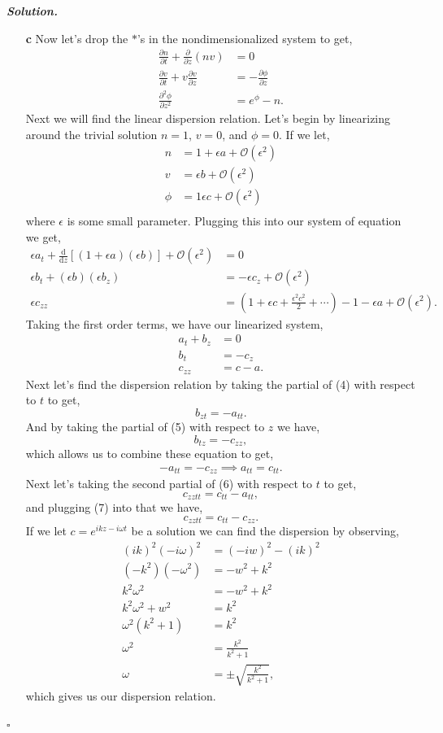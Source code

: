 \documentclass[12pt]{report}
\newenvironment{solution}[1][\it{Solution}]{\textbf{#1. } }{$\square$}
\def\eps{{\epsilon}}
\def\O{{\mathcal{O}}}
\newcommand{\pp}[2]{\frac{\partial #1}{\partial #2}} %
\newcommand{\ppn}[3]{\frac{\partial^{#1} #2}{\partial #3^{#1}}} %
\newcommand{\dd}[2]{\frac{\mathrm{d} #1}{\mathrm{d} #2}} %
\begin{document}
\begin{solution}
\begin{enumerate}
    \item[{\bf c}] Now let's drop the $*$'s in the nondimensionalized system to get, 
    \begin{align*}
        \pp{n}{t}+\pp{}{z}(nv)&=0\\
        \pp{v}{t}+v\pp{v}{z}&= -\pp{\phi}{z}\\
        \ppn{2}{\phi}{z}&= e^\phi-n.    
    \end{align*}
    Next we will find the linear dispersion relation. Let's begin by linearizing around the trivial solution $n=1$, $v=0$, and
    $\phi=0$. If we let,
    \begin{align*}
        n &= 1 + \eps a + \O(\eps^2)\\
        v &= \eps b + \O(\eps^2)\\
        \phi &= 1 \eps c + \O(\eps^2)\\
    \end{align*}
    where $\eps$ is some small parameter. Plugging this into our system of equation we get,
    \begin{align*}
        \eps a_t + \dd{}{z}\left[ (1+\eps a)(\eps b)\right] + \O(\eps^2)&=0\\
        \eps b_t + (\eps b)(\eps b_z) &= -\eps c_z + \O(\eps^2)\\
        \eps c_{zz} &= \left( 1 + \eps c + \frac{\eps^2 c^2}{2} + \cdots \right) - 1 - \eps a + \O(\eps^2).
    \end{align*}
    Taking the first order terms, we have our linearized system,
    \begin{align}
        a_t + b_z &= 0\\
        b_t &= - c_z\\
        c_{zz} &= c - a.
    \end{align}
    Next let's find the dispersion relation by taking the partial of (4) with respect to $t$ to get,
    \[b_{zt} = -a_{tt}.\]
    And by taking the partial of (5) with respect to $z$ we have,
    \[b_{tz} = -c_{zz},\]
    which allows us to combine these equation to get,
    \begin{align}
        -a_{tt} = -c_{zz} \implies a_{tt} = c_{tt}.
    \end{align}
    Next let's taking the second partial of (6) with respect to $t$ to get,
    \[ c_{zztt} = c_{tt} - a_{tt},\]
    and plugging (7) into that we have,
    \[ c_{zztt} = c_{tt} - c_{zz}.\]
    If we let $c = e^{ikz - i\omega t}$ be a solution we can find the dispersion by observing,
    \begin{align*}
        (ik)^2(-i\omega)^2 &= (-iw)^2 - (ik)^2\\
        (-k^2)(-\omega^2) &= -w^2 + k^2\\
        k^2\omega^2 &= -w^2 + k^2\\
        k^2\omega^2 + w^2 &= k^2\\
        \omega^2(k^2 + 1) &= k^2\\
        \omega^2 &= \frac{k^2}{k^2 + 1}\\
        \omega &= \pm \sqrt{\frac{k^2}{k^2 + 1}},
    \end{align*}
    which gives us our dispersion relation. 


\end{enumerate}
\end{solution}
\end{document}
